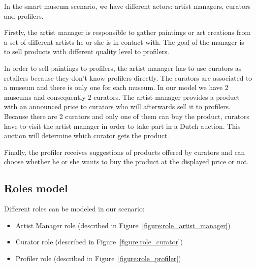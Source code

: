 \documentclass[a4paper,11pt]{report}
\begin{document}
  In the smart museum scenario, we have different actors: artist managers, curators 
  and profilers.
  
  Firstly, the artist manager is responsible to gather paintings or art creations 
  from a set of different artists he or she is in contact with. The goal of the manager 
  is to sell products with different quality level to profilers.
  
  In order to sell paintings to profilers, the artist manager has to use curators as retailers 
  because they don't know profilers directly. The curators are associated to a museum and there
  is only one for each museum. In our model we have 2 museums and consequently 2 curators. The artist manager 
  provides a product with an announced price to curators who will afterwards
  sell it to profilers. Because there are 2 curators and only one of them can buy 
  the product, curators have to visit the artist manager in order to take part in a Dutch auction. 
  This auction will determine which curator gets the product.
  
  Finally, the profiler receives suggestions of products offered by curators and can choose whether he or 
  she wants to buy the product at the displayed price or not.
  
  
  \subsection{Roles model}
  
  Different roles can be modeled in our scenario:
  \begin{itemize}
  \itemsep0pt
   \item Artist Manager role (described in Figure~\ref{figure:role_artist_manager})
   \item Curator role (described in Figure~\ref{figure:role_curator})
   \item Profiler role (described in Figure~\ref{figure:role_profiler})
  \end{itemize}
\end{document}
